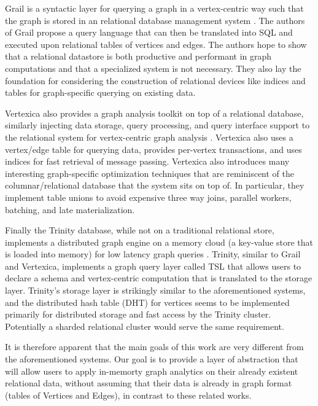\documentclass[11pt,letterpaper]{article}
\begin{document}
Grail \cite{fan_case_2015} is a syntactic layer for querying a graph in a vertex-centric way such that the graph is stored in an relational database management system
\cite{fan_case_2015}. The authors of Grail propose a query language that can then be translated into SQL and executed upon relational tables of vertices and edges. The authors hope to show that a relational datastore is both productive and performant in graph computations and that a specialized system is not necessary. They also lay the foundation for considering the construction of relational devices like indices and tables for graph-specific querying on existing data.

Vertexica \cite{jindal_vertexica:_2014} also provides a graph analysis toolkit on top of a relational database, similarly injecting data storage, query processing, and query interface support to the relational system for vertex-centric graph analysis \cite{jindal_vertexica:_2014}. Vertexica also uses a vertex/edge table for querying data, provides per-vertex transactions, and uses indices for fast retrieval of message passing. Vertexica also introduces many interesting graph-specific optimization techniques that are reminiscent of the columnar/relational database that the system sits on top of. In particular, they implement table unions to avoid expensive three way joins, parallel workers, batching, and late materialization.

Finally the Trinity \cite{shao_trinity:_2013} database, while not on a traditional relational store, implements a distributed graph engine on a memory cloud (a key-value store that is loaded into memory) for low latency graph queries \cite{shao_trinity:_2013}. Trinity, similar to Grail and Vertexica, implements a graph query layer called TSL that allows users to declare a schema and vertex-centric computation that is translated to the storage layer. Trinity's storage layer is strikingly similar to the aforementioned systems, and the distributed hash table (DHT) for vertices seems to be implemented primarily for distributed storage and fast access by the Trinity cluster. Potentially a sharded relational cluster would serve the same requirement.

It is therefore apparent that the main goals of this work are very different from the aforementioned systems. Our goal is to provide a layer of abstraction that will allow users to apply in-memorty graph analytics on their already existent relational data, without assuming that their data is already in graph format (tables of Vertices and Edges), in contrast to these related works.
\end{document}
